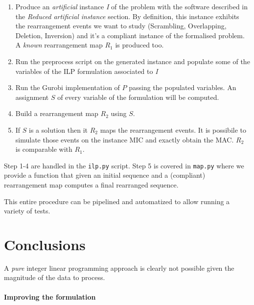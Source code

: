\begin{enumerate}
	\item Produce an \textit{artificial} instance \textit{I} of the problem with the software described in the \textit{Reduced artificial instance} section. By definition, this instance exhibits the rearrangement events we want to study (Scrambling, Overlapping, Deletion, Inversion) and it's a compliant instance of the formalised problem. A \textit{known} rearrangement map $R_1$ is produced too.
	\item Run the preprocess script on the generated instance and populate some of the variables of the ILP formulation associated to \textit{I}
	\item Run the Gurobi implementation of $P$ passing the populated variables. An assignment $S$ of every variable of the formulation will be computed.
	\item Build a rearrangement map $R_2$ using $S$.
	\item If $S$ is a solution then it $R_2$ maps the rearrangement events. It is possibile to simulate those events on the instance MIC and exactly obtain the MAC. $R_2$ is comparable with $R_1$.
\end{enumerate}

Step 1-4 are handled in the \texttt{ilp.py} script. Step 5 is covered in \texttt{map.py} where we provide a function that given an initial sequence and a (compliant) rearrangement map computes a final rearranged sequence.

This entire procedure can be pipelined and automatized to allow running a variety of tests.

\section{Conclusions}

A \textit{pure} integer linear programming approach is clearly not possible given the magnitude of the data to process.

\paragraph{Improving the formulation}